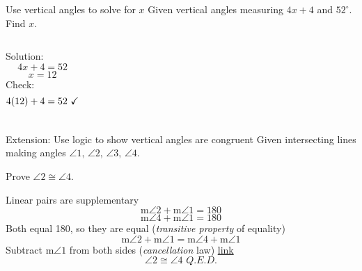 \documentclass[onlytextwidth]{beamer}
\begin{document}
\begin{frame}{Use vertical angles to solve for $x$}
  Given vertical angles measuring $4x+4$ and $52^\circ$. Find $x$. \par \vspace{1cm}
  \begin{columns}
      Solution:
        $$4x+4 = 52$$
        $$x=12$$
      Check:
        $$4(12)+4=52 \text{ \checkmark}$$
  \end{columns}
\end{frame}

\begin{frame}{Extension: Use logic to show vertical angles are congruent}
  Given intersecting lines making angles  
    $\angle 1 \text{, } \angle 2 \text{, } \angle 3 \text{, } \angle 4$. \par \medskip Prove $\angle 2 \cong \angle 4$.
  \begin{center}
  \end{center}
    Linear pairs are supplementary
      $$\text{m}\angle 2 + \text{m}\angle 1 = 180$$
      $$\text{m}\angle 4 + \text{m}\angle 1 = 180$$
    Both equal 180, so they are equal (\emph{transitive property} of equality)
      $$\text{m}\angle 2 + \text{m}\angle 1 = \text{m}\angle 4 + \text{m}\angle 1$$
    Subtract $\text{m}\angle 1$ from both sides (\emph{cancellation} law) \hfill \href{https://mathworld.wolfram.com/QED.html}{link}
      $$\angle 2 \cong \angle 4 \textit{ Q.E.D.}$$
\end{frame}
\end{document}
